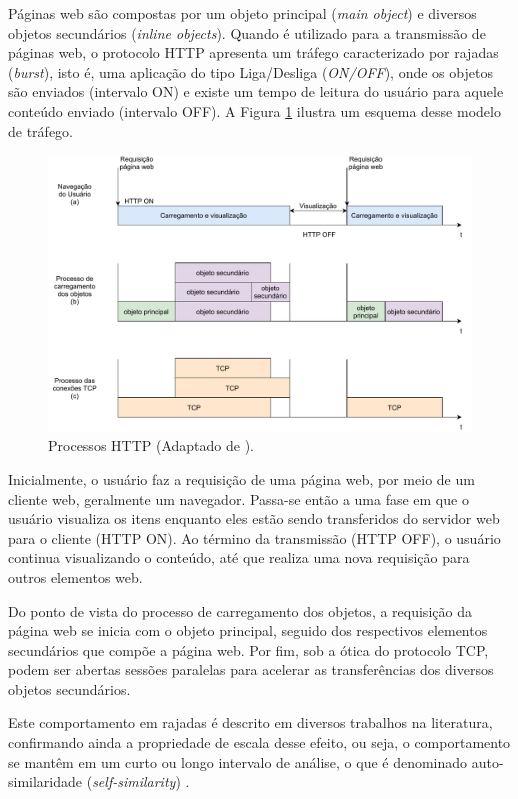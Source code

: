 Páginas web são compostas por um objeto principal (\textit{main object}) e diversos objetos secundários (\textit{inline objects}). Quando é utilizado para a transmissão de páginas web, o protocolo HTTP apresenta um tráfego caracterizado por rajadas (\textit{burst}), isto é, uma aplicação do tipo Liga/Desliga (\textit{ON/OFF}), onde os objetos são enviados (intervalo ON) e existe um tempo de leitura do usuário para aquele conteúdo enviado (intervalo OFF). A Figura \ref{fig:http-process} ilustra um esquema desse modelo de tráfego.

\begin{figure}
	\centering
	\includegraphics[scale=0.7]{textuais/http-process.pdf}
	\caption[Processos HTTP]{Processos HTTP (Adaptado de \cite{Pries2012}).
		\label{fig:http-process}}
\end{figure}


Inicialmente, o usuário faz a requisição de uma página web, por meio de um cliente web, geralmente um navegador. Passa-se então a uma fase em que o usuário visualiza os itens enquanto eles estão sendo transferidos do servidor web para o cliente (HTTP ON). Ao término da transmissão (HTTP OFF), o usuário continua visualizando o conteúdo, até que realiza uma nova requisição para outros elementos web.

Do ponto de vista do processo de carregamento dos objetos, a requisição da página web se inicia com o objeto principal, seguido dos respectivos elementos secundários que compõe a página web. Por fim, sob a ótica do protocolo TCP, podem ser abertas sessões paralelas para acelerar as transferências dos diversos objetos secundários.

Este comportamento em rajadas é descrito em diversos trabalhos na literatura, confirmando ainda a propriedade de escala desse efeito, ou seja, o comportamento se mantêm em um curto ou longo intervalo de análise, o que é denominado auto-similaridade (\textit{self-similarity}) \cite{Crovella1997}.

